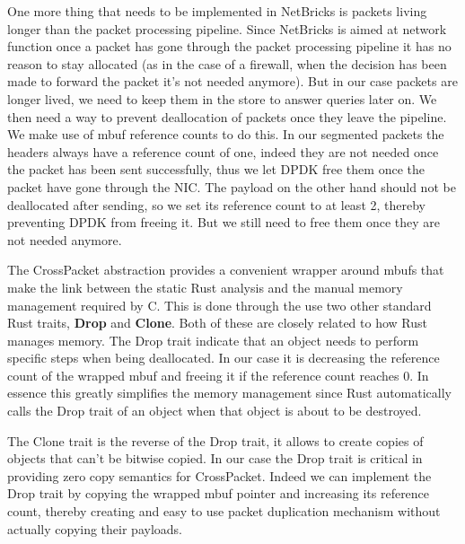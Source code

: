 One more thing that needs to be implemented in NetBricks is packets
living longer than the packet processing pipeline. Since NetBricks is
aimed at network function once a packet has gone through the packet
processing pipeline it has no reason to stay allocated (as in the case
of a firewall, when the decision has been made to forward the packet
it's not needed anymore). But in our case packets are longer lived, we
need to keep them in the store to answer queries later on. We then
need a way to prevent deallocation of packets once they leave the
pipeline. We make use of mbuf reference counts to do this. In our
segmented packets the headers always have a reference count of one,
indeed they are not needed once the packet has been sent successfully,
thus we let DPDK free them once the packet have gone through the
NIC\@. The payload on the other hand should not be deallocated after
sending, so we set its reference count to at least 2, thereby
preventing DPDK from freeing it. But we still need to free them once
they are not needed anymore.

The CrossPacket abstraction provides a convenient wrapper around mbufs
that make the link between the static Rust analysis and the manual
memory management required by C. This is done through the use two
other standard Rust traits, \textbf{Drop} and \textbf{Clone}.
Both of these are closely related to how Rust manages memory. The Drop
trait indicate that an object needs to perform specific steps when
being deallocated. In our case it is decreasing the reference count of
the wrapped mbuf and freeing it if the reference count reaches 0. In
essence this greatly simplifies the memory management since Rust
automatically calls the Drop trait of an object when that object
is about to be destroyed.



The Clone trait is the reverse of the Drop trait, it allows to create
copies of objects that can't be bitwise copied. In our case the Drop
trait is critical in providing zero copy semantics for
CrossPacket. Indeed we can implement the Drop trait by copying the
wrapped mbuf pointer and increasing its reference count, thereby
creating and easy to use packet duplication mechanism without actually
copying their payloads.


